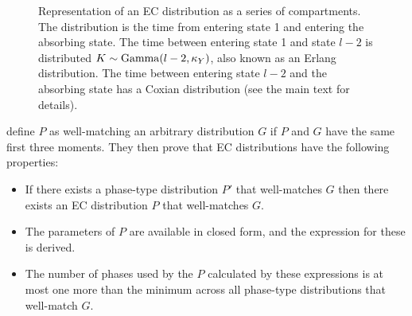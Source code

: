 \documentclass[thesis.tex]{subfiles}
\begin{document}
\begin{figure}
\caption[A $l$ phase EC distribution.]{Representation of an EC distribution as a series of compartments. The distribution is the time from entering state 1 and entering the absorbing state. The time between entering state 1 and state $l-2$ is distributed $K \sim \operatorname{Gamma}(l-2, \kappa_Y)$, also known as an Erlang distribution. The time between entering state $l-2$ and the absorbing state has a Coxian distribution (see the main text for details).}
\label{SEIR:fig:EC}
\end{figure}

\Textcite{osogamiClosed} define $P$ as well-matching an arbitrary distribution $G$ if $P$ and $G$ have the same first three moments.
They then prove that EC distributions have the following properties:
\begin{itemize}
    \item If there exists a phase-type distribution $P'$ that well-matches $G$ then there exists an EC distribution $P$ that well-matches $G$.
    \item The parameters of $P$ are available in closed form, and the expression for these is derived.
    \item The number of phases used by the $P$ calculated by these expressions is at most one more than the minimum across all phase-type distributions that well-match $G$.
\end{itemize}
\end{document}
